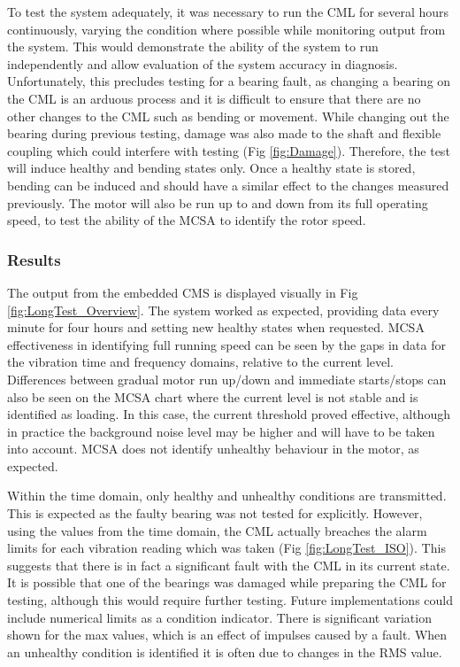 To test the system adequately, it was necessary to run the CML for several hours continuously, varying the condition where possible while monitoring output from the system.
This would demonstrate the ability of the system to run independently and allow evaluation of the system accuracy in diagnosis.
Unfortunately, this precludes testing for a bearing fault, as changing a bearing on the CML is an arduous process and it is difficult to ensure that there are no other changes to the CML such as bending or movement.
While changing out the bearing during previous testing, damage was also made to the shaft and flexible coupling which could interfere with testing (Fig \ref{fig:Damage}).
Therefore, the test will induce healthy and bending states only.
Once a healthy state is stored, bending can be induced and should have a similar effect to the changes measured previously.
The motor will also be run up to and down from its full operating speed, to test the ability of the MCSA to identify the rotor speed.

\subsubsection{Results}



The output from the embedded CMS is displayed visually in Fig \ref{fig:LongTest_Overview}.
The system worked as expected, providing data every minute for four hours and setting new healthy states when requested.
MCSA effectiveness in identifying full running speed can be seen by the gaps in data for the vibration time and frequency domains, relative to the current level.
Differences between gradual motor run up/down and immediate starts/stops can also be seen on the MCSA chart where the current level is not stable and is identified as loading.
In this case, the current threshold proved effective, although in practice the background noise level may be higher and will have to be taken into account.
MCSA does not identify unhealthy behaviour in the motor, as expected.
\par



Within the time domain, only healthy and unhealthy conditions are transmitted.
This is expected as the faulty bearing was not tested for explicitly.
However, using the values from the time domain, the CML actually breaches the alarm limits for each vibration reading which was taken (Fig \ref{fig:LongTest_ISO}).
This suggests that there is in fact a significant fault with the CML in its current state.
It is possible that one of the bearings was damaged while preparing the CML for testing, although this would require further testing.
Future implementations could include numerical limits as a condition indicator.
There is significant variation shown for the max values, which is an effect of impulses caused by a fault.
When an unhealthy condition is identified it is often due to changes in the RMS value.
\par


